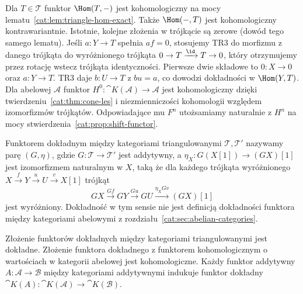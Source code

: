 \begin{przyklad}\label{cat:ex:cohomological-functors}
Dla $T\in\mathcal T$ funktor $\Hom(T,-)$ jest kohomologiczny na mocy lematu~\ref{cat:lem:triangle-hom-exact}. Także $\Hom(-,T)$ jest kohomologiczny kontrawariantnie. Istotnie, kolejne złożenia w trójkącie są zerowe (dowód tego samego lematu). Jeśli $a:Y\to T$ spełnia $af=0$, stosujemy TR3 do morfizmu z danego trójkąta do wyróżnionego trójkąta $0\to T\xrightarrow{\id}T\to0$, który otrzymujemy przez rotację wstecz trójkąta identyczności. Pierwsze dwie składowe to $0:X\to0$ oraz $a:Y\to T$. TR3 daje $b:U\to T$ z $bu=a$, co dowodzi dokładności w $\Hom(Y,T)$. Dla abelowej $\mathcal A$ funktor $H^0:\cat K(\mathcal A)\to\mathcal A$ jest kohomologiczny dzięki twierdzeniu~\ref{cat:thm:cone-les} i niezmienniczości kohomologii względem izomorfizmów trójkątów. Odpowiadające mu $F^n$ utożsamiamy naturalnie z $H^n$ na mocy stwierdzenia~\ref{cat:prop:shift-functor}.
\end{przyklad}
\begin{definicja}\label{cat:def:triangulated-exact-functor}
Funktorem dokładnym między kategoriami triangulowanymi $\mathcal T,\mathcal T'$ nazywamy parę $(G,\eta)$, gdzie $G:\mathcal T\to\mathcal T'$ jest addytywny, a $\eta_X:G(X[1])\to (GX)[1]$ jest izomorfizmem naturalnym w $X$, taką że dla każdego trójkąta wyróżnionego $X\xrightarrow f Y\xrightarrow u U\xrightarrow v X[1]$ trójkąt
\[
 GX\xrightarrow{Gf}GY\xrightarrow{Gu}GU
 \xrightarrow{\eta_X Gv}(GX)[1]
\]
jest wyróżniony. Dokładność w tym sensie nie jest definicją dokładności funktora między kategoriami abelowymi z rozdziału~\ref{cat:sec:abelian-categories}.
\end{definicja}
\begin{stwierdzenie}\label{cat:prop:triangulated-exact-composition}
Złożenie funktorów dokładnych między kategoriami triangulowanymi jest dokładne. Złożenie funktora dokładnego z funktorem kohomologicznym o wartościach w kategorii abelowej jest kohomologiczne. Każdy funktor addytywny $A:\mathcal A\to\mathcal B$ między kategoriami addytywnymi indukuje funktor dokładny $\cat K(A):\cat K(\mathcal A)\to\cat K(\mathcal B)$.
\end{stwierdzenie}
